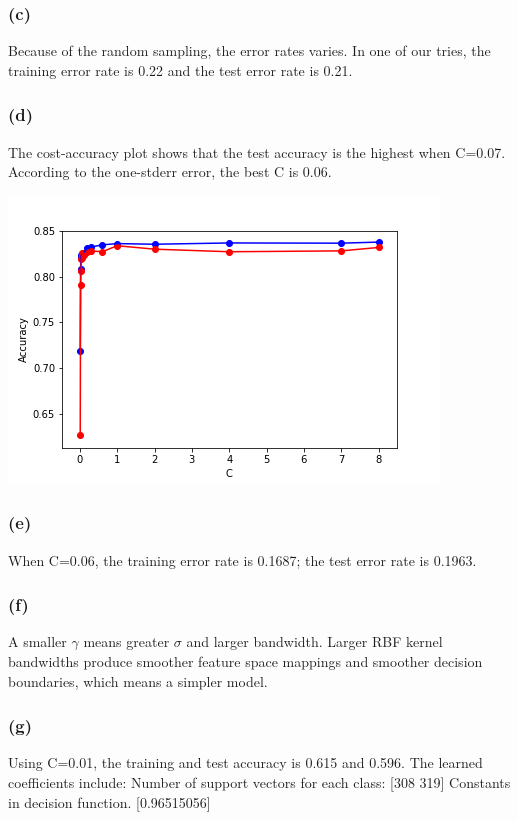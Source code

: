 \documentclass[12pt]{article}
\begin{document}
{\subsubsection*{(c)}
Because of the random sampling, the error rates varies. In one of our tries, the training error rate is 0.22 and the test error rate is 0.21. 

\subsubsection*{(d)}
The cost-accuracy plot shows that the test accuracy is the highest when C=0.07. According to the one-stderr error, the best C is 0.06. 

\begin{center}
\includegraphics[scale=0.8]{P2/cross_validation_linear.png}
\end{center}

\subsubsection*{(e)}
When C=0.06, the training error rate is 0.1687; the test error rate is 0.1963. 


\subsubsection*{(f)}
A smaller $\gamma$ means greater $\sigma$ and larger bandwidth. Larger RBF kernel bandwidths produce smoother feature space mappings and smoother decision boundaries, which means a simpler model. 


\subsubsection*{(g)}
Using C=0.01, the training and test accuracy is 0.615 and 0.596. The learned coefficients include: \newline
Number of support vectors for each class: [308 319] \newline
Constants in decision function. [0.96515056]

}
\end{document}
